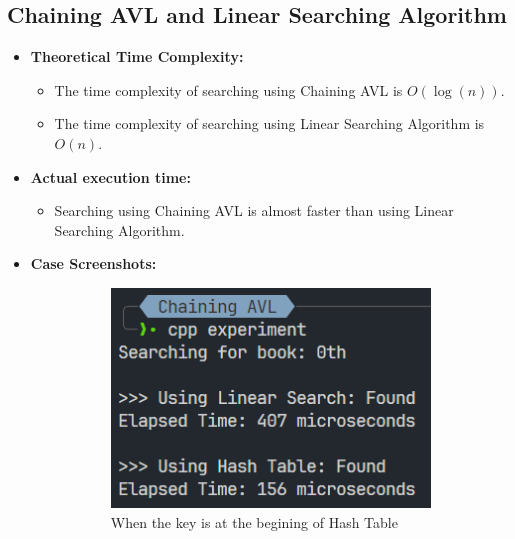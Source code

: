 \pagebreak
\subsection{Chaining AVL and Linear Searching Algorithm}
\begin{itemize}
	\item \textbf{Theoretical Time Complexity:}
	      \begin{itemize}
		      \item The time complexity of searching using Chaining AVL is \(O(\log(n))\).
		      \item The time complexity of searching using Linear Searching Algorithm is \(O(n)\).
	      \end{itemize}
	\item \textbf{Actual execution time:}
	      \begin{itemize}
		      \item Searching using Chaining AVL is almost faster than using Linear Searching Algorithm.
	      \end{itemize}
	\item \textbf{Case Screenshots:}
	      \begin{figure}[!ht]
		      \centering
		      \begin{subfigure}{0.45\textwidth}
			      \centering
			      \includegraphics[width=\textwidth]{imgs/Chaining AVL/beg.png}
			      \caption{When the key is at the begining of Hash Table}\label{fig:chainingavl-beg-metric}
		      \end{subfigure}
		      \hfill
		      \begin{subfigure}{0.45\textwidth}
			      \centering

\end{subfigure}
\end{figure}
\end{itemize}

